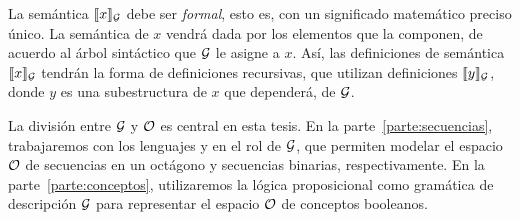 La semántica $\sem{x}_\gram$ debe ser {\em formal}, esto es, con un significado matemático preciso único. La semántica de $x$ vendrá dada por los elementos que la componen, de acuerdo al árbol sintáctico que $\gram$ le asigne a $x$. Así, las definiciones de semántica $\sem{x}_\gram$ tendrán la forma de definiciones recursivas, que utilizan definiciones $\sem{y}_\gram$, donde $y$ es una subestructura de $x$ que dependerá, de $\gram$.



La división entre $\gram$ y $\+O$ es central en esta tesis.
En la parte~\ref{parte:secuencias}, trabajaremos con los lenguajes \gramgeo y \grambin en el rol de $\gram$, que permiten modelar el espacio $\+O$ de secuencias en un octágono y secuencias binarias, respectivamente. En la parte~\ref{parte:conceptos}, utilizaremos la lógica proposicional \grambool como gramática de descripción $\gram$ para representar el espacio $\+O$ de conceptos booleanos. 




